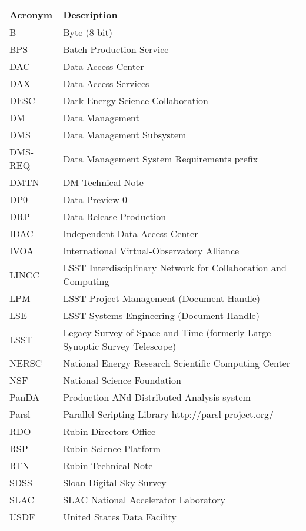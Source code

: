 \addtocounter{table}{-1}
\begin{longtable}{p{}p{}}\hline
\textbf{Acronym} & \textbf{Description}  \\\hline

B & Byte (8 bit) \\\hline
BPS & Batch Production Service \\\hline
DAC & Data Access Center \\\hline
DAX & Data Access Services \\\hline
DESC & Dark Energy Science Collaboration \\\hline
DM & Data Management \\\hline
DMS & Data Management Subsystem \\\hline
DMS-REQ & Data Management System Requirements prefix \\\hline
DMTN & DM Technical Note \\\hline
DP0 & Data Preview 0 \\\hline
DRP & Data Release Production \\\hline
IDAC & Independent Data Access Center \\\hline
IVOA & International Virtual-Observatory Alliance \\\hline
LINCC & LSST Interdisciplinary Network for Collaboration and Computing \\\hline
LPM & LSST Project Management (Document Handle) \\\hline
LSE & LSST Systems Engineering (Document Handle) \\\hline
LSST & Legacy Survey of Space and Time (formerly Large Synoptic Survey Telescope) \\\hline
NERSC & National Energy Research Scientific Computing Center \\\hline
NSF & National Science Foundation \\\hline
PanDA &  Production ANd Distributed Analysis system \\\hline
Parsl & Parallel Scripting Library \url{http://parsl-project.org/} \\\hline
RDO & Rubin Directors Office \\\hline
RSP & Rubin Science Platform \\\hline
RTN & Rubin Technical Note \\\hline
SDSS & Sloan Digital Sky Survey \\\hline
SLAC & SLAC National Accelerator Laboratory \\\hline
USDF & United States Data Facility \\\hline
\end{longtable}
